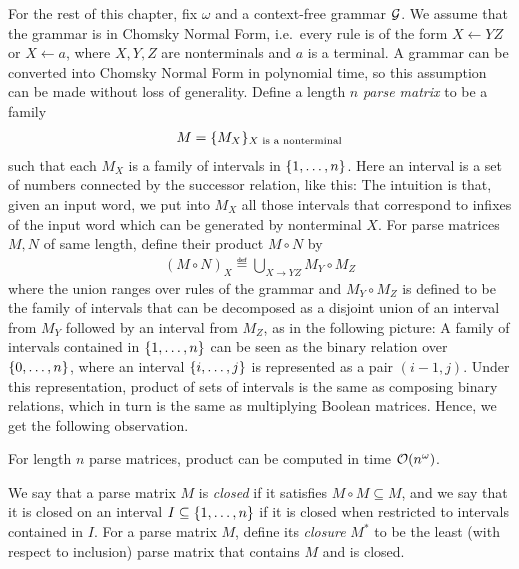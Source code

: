 For the rest of this chapter, fix $\omega$ and a context-free grammar $\mathcal{G}$. We assume that the grammar is in Chomsky Normal Form, i.e.~every rule is of the form $X \leftarrow YZ$ or $X \leftarrow a$, where $X,Y,Z$ are nonterminals and $a$ is a terminal. A grammar can be converted into Chomsky Normal Form in polynomial time, so this assumption can be made without loss of generality. 
\newcommand{\ptrip}[3]{#1 \stackrel {#2} \to #3}
Define a length $n$ \emph{parse matrix} to be a family
\begin{align*}
M =   \{M_X\}_{\text{$X$ is a nonterminal}}
\end{align*}
such that each $M_X$ is a family of intervals in $\{1,\ldots,n\}$. Here an interval is a set of numbers connected by the successor relation, like this:
 The intuition is that, given an input word, we put into $M_X$ all those intervals that correspond to infixes of the input word which  can be generated by nonterminal $X$.
For parse matrices $M,N$ of same length, define their product $M \circ N$ by
\begin{align*}
(M \circ N)_X \eqdef \bigcup_{X \to YZ} M_Y \circ M_Z
\end{align*}
where the union ranges over rules of the grammar and $M_Y \circ M_Z$ is defined to be the family of intervals that can be decomposed as a disjoint union of an interval from $M_Y$ followed by an interval from $M_Z$, as in the following picture:
A family of intervals contained in $\{1,\ldots,n\}$ can be seen as the binary relation over $\{0,\ldots,n\}$, where an interval $\{i,\ldots,j\}$ is represented as a pair $(i-1,j)$. Under this representation, product of sets of intervals is the same as composing binary relations, which in turn is the same as multiplying Boolean matrices. Hence, we get the following observation.

\begin{lemma}\label{lem:matrix-mult}
	For length $n$ parse matrices, product can be computed in time $\mathcal{O}(n^\omega)$.
\end{lemma}
We say that a parse matrix $M$ is \emph{closed} if it satisfies $M \circ M \subseteq M$, and we say that it is closed  on an interval $I \subseteq \{1,\ldots,n\}$ if it is closed when restricted to intervals contained in $I$.  For a parse matrix $M$, define its \emph{closure} $M^*$ to be the least (with respect to inclusion) parse matrix that contains $M$ and is closed.



